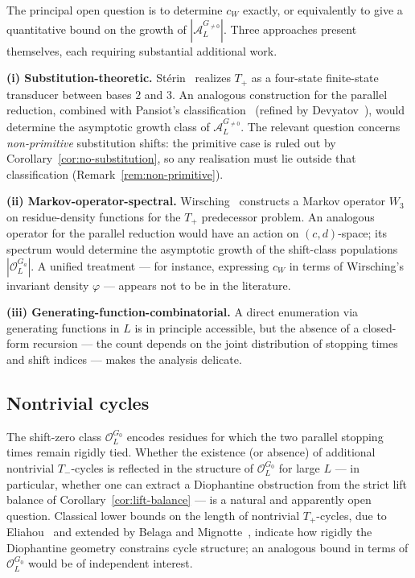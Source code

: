 \documentclass[11pt,reqno]{amsart}
\theoremstyle{plain}
\theoremstyle{definition}
\theoremstyle{remark}
\newcommand{\Tplus}{T_{+}}
\newcommand{\Tminus}{T_{-}}
\newcommand{\Obs}{\mathcal{O}}
\newcommand{\Atom}{\mathcal{A}}
\begin{document}
The principal open question is to determine $c_W$ exactly, or equivalently
to give a quantitative bound on the growth of $|\Atom_L^{G_{\ne 0}}|$. Three
approaches present themselves, each requiring substantial additional work.

\textbf{(i) Substitution-theoretic.} Stérin~\cite{Sterin2020} realizes
$\Tplus$ as a four-state finite-state transducer between bases $2$ and
$3$. An analogous construction for the parallel reduction, combined with
Pansiot's classification~\cite{Pansiot1984} (refined by
Devyatov~\cite{Devyatov2015}), would determine the asymptotic growth
class of $\Atom_L^{G_{\ne 0}}$. The relevant question concerns
\emph{non-primitive} substitution shifts: the primitive case is ruled out
by Corollary~\ref{cor:no-substitution}, so any realisation must lie
outside that classification (Remark~\ref{rem:non-primitive}).

\textbf{(ii) Markov-operator-spectral.} Wirsching~\cite{Wirsching1998}
constructs a Markov operator $W_3$ on residue-density functions for the
$\Tplus$ predecessor problem. An analogous operator for the parallel
reduction would have an action on $(c, d)$-space; its spectrum would
determine the asymptotic growth of the shift-class populations
$|\Obs_L^{G_a}|$. A unified treatment --- for instance, expressing $c_W$
in terms of Wirsching's invariant density $\varphi$ --- appears not to be
in the literature.

\textbf{(iii) Generating-function-combinatorial.} A direct enumeration via
generating functions in $L$ is in principle accessible, but the absence of a
closed-form recursion --- the count depends on the joint distribution of
stopping times and shift indices --- makes the analysis delicate.

\subsection{Nontrivial cycles}

The shift-zero class $\Obs_L^{G_0}$ encodes residues for which the two
parallel stopping times remain rigidly tied. Whether the existence (or
absence) of additional nontrivial $\Tminus$-cycles is reflected in the
structure of $\Obs_L^{G_0}$ for large $L$ --- in particular, whether one
can extract a Diophantine obstruction from the strict lift balance of
Corollary~\ref{cor:lift-balance} --- is a natural and apparently open
question. Classical lower bounds on the length of nontrivial
$\Tplus$-cycles, due to Eliahou~\cite{Eliahou1993} and extended by
Belaga and Mignotte~\cite{BelagaMignotte2006}, indicate how rigidly the
Diophantine geometry constrains cycle structure; an analogous bound in
terms of $\Obs_L^{G_0}$ would be of independent interest.
\end{document}
